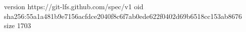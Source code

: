 version https://git-lfs.github.com/spec/v1
oid sha256:55a1a481b9e7156acfdce2040f8c6f7ab0ede622f0402d69b6518cc153ab8676
size 1703
